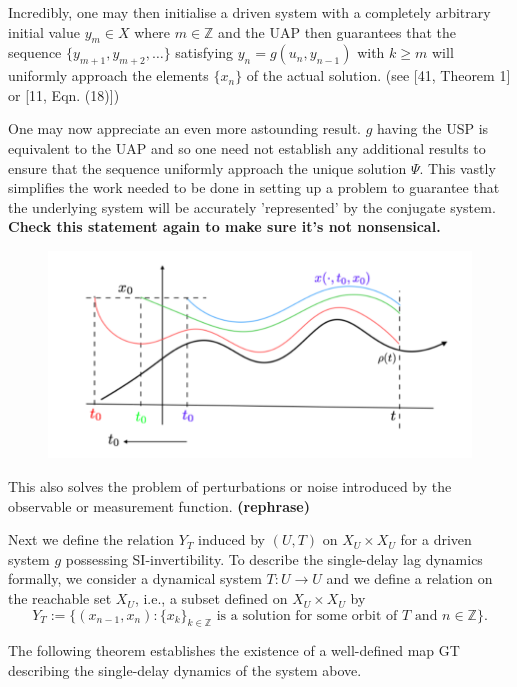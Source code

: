 \documentclass[12 pt]{article}
\begin{document}
Incredibly, one may then initialise a driven system with a completely arbitrary initial value $y_m\in{X}$ where $m\in\mathbb{Z}$ and the UAP then guarantees that the sequence $\{y_{m+1}, y_{m+2},\ldots\}$ satisfying $y_n=g(u_n, y_{n-1})$  with $k\geq{m}$  will uniformly approach the elements $\{x_n\}$ of the actual solution. (see [41, Theorem 1] or [11, Eqn. (18)]) 
 
One may now appreciate an even more astounding result. $g$ having the USP is equivalent to the UAP and so one need not establish any additional results to ensure that the sequence uniformly approach the unique solution $\Psi$. This vastly simplifies the work needed to be done in setting up a problem to guarantee that the underlying system will be accurately 'represented' by the conjugate system. \textbf{Check this statement again to make sure it's not nonsensical.} 

\begin{figure}[h]
  \includegraphics[scale=0.4]{memloss_conttime.png}
  \centering
  \label{fig:memoryLosscont_time}
\end{figure}

This also solves the problem of perturbations or noise introduced by the observable or measurement function. \textbf{(rephrase)}

Next we define the relation $Y_T$ induced by $(U,T)$ on $X_U\times{X_U}$ for a driven system $g$ possessing SI-invertibility.  To describe the  single-delay lag dynamics formally, we consider a dynamical system $T: U \to U$ and we define a relation on the reachable set $X_U$, i.e., a subset defined on $X_U \times X_U$ by 
$$Y_T:=\{(x_{n-1},x_n): \{x_k\}_{k\in \mathbb{Z}} \mbox{ is a solution for some orbit of } T \mbox{ and } n \in \mathbb{Z}\}.$$ 

The following theorem establishes the existence of a well-defined map GT describing the single-delay dynamics of the system above. 
\end{document}
